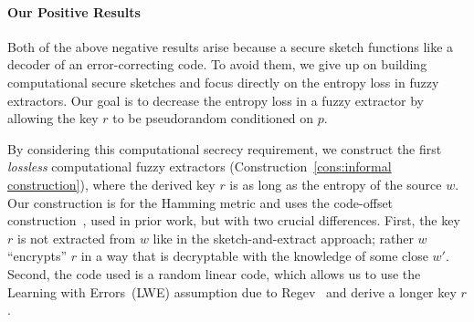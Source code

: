 \documentclass[11pt]{article}
\newcommand{\consref}[1]{\mbox{Construction~\ref{#1}}}
\newcommand{\class}[1]{{\ensuremath{\mathsf{#1}}}}
\newcommand{\rep}{\ensuremath{\class{Rep}}\xspace}
\newcommand{\rec}{\ensuremath{\class{Rec}}\xspace}
\newcommand{\authnote}[2]{{\textcolor{red}{\textsf{#1 notes: }\textcolor{blue}{ #2}}\marginpar{\textcolor{red}{\textbf{!!!!!}}}}}
\newcommand{\authnote}[2]{}
\newcommand{\lnote}[1]{{\authnote{Leo}{#1}}}
\newcommand{\recout}{x}
\begin{document}





\paragraph {Our Positive Results}

Both of the above negative results arise because a secure sketch functions like a decoder of an error-correcting code.  To avoid them, we give up on building computational secure sketches and focus directly on the entropy loss in fuzzy extractors.  Our goal is to decrease the entropy loss in a fuzzy extractor by allowing the key $r$ to be pseudorandom conditioned on $p$.  

By considering this computational secrecy requirement, we construct the first \emph{lossless} computational fuzzy extractors (\consref{cons:informal construction}), where the derived key $r$ is as long as the entropy of the source $w$. Our construction is for the Hamming metric and uses the code-offset construction~\cite{JW99},\cite[Section 5]{DBLP:journals/siamcomp/DodisORS08} used in prior work, but with two crucial differences.  First, the key $r$ is not extracted from $w$ like in the sketch-and-extract approach; rather $w$ ``encrypts'' $r$ in a way that is decryptable with the knowledge of some close $w'$. Second, the code used is a random linear code, which allows us to use the Learning with Errors~(LWE) assumption due to Regev~\cite{regev2005LWE, regevLWEsurvey} and derive a longer key $r$.
\end{document}
